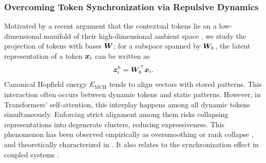 \subsubsection{Overcoming Token Synchronization via Repulsive Dynamics}
Motivated by a recent argument that the contextual tokens lie on a low-dimensional manifold of their high-dimensional ambient space \citep{yu2023white}, we study the projection of tokens with bases ${\bm{W}}$; for a subspace spanned by ${\bm{W}}_h$, the latent representation of a token ${\bm{x}}_i$ can be written as 
\begin{equation}
\label{eq:1}
    {\bm{z}}_i^h = {\bm{W}}_h^\top{\bm{x}}_i.
\end{equation}
Canonical Hopfield energy $E_\text{MCH}$ tends to align vectors with stored patterns. This interaction often occurs between dynamic tokens and static patterns. However, in Transformers' self-attention, this interplay happens among all dynamic tokens simultaneously. Enforcing strict alignment among them risks collapsing representations into degenerate clusters, reducing expressiveness. This phenomenon has been observed empirically as oversmoothing \citep{chen2022principle,wu2024demystifying} or rank collapse \citep{pmlr-v139-dong21a}, and theoretically characterized in \citep{geshkovski2023the}. It also relates to the synchronization effect in coupled systems \citep{acebron2005kuramoto,miyato2025artificial}. 

